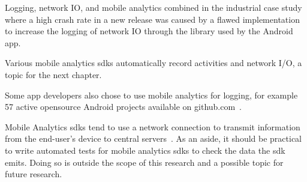 Logging, network IO, and mobile analytics combined in the industrial case study where a high crash rate in a new release was caused by a flawed implementation to increase the logging of network IO through the  library used by the Android app. 

Various mobile analytics \Glspl{sdk} automatically record activities and network I/O, a topic for the next chapter. 

Some app developers also chose to use mobile analytics for logging, for example 57 active opensource Android projects available on github.com~.

Mobile Analytics \Gls{sdk}s tend to use a network connection to transmit information from the end-user's device to central servers~. As an aside, it should be practical to write automated tests for mobile analytics \Gls{sdk}s to check the data the \Gls{sdk} emits. Doing so is outside the scope of this research and a possible topic for future research. %

